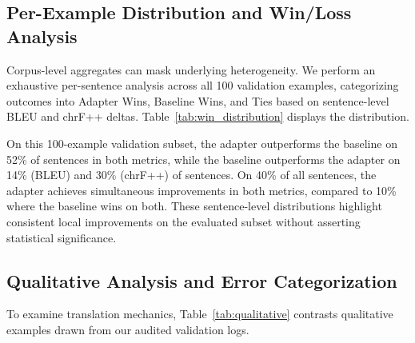 \documentclass[conference]{IEEEtran}
\begin{document}
\subsection{Per-Example Distribution and Win/Loss Analysis}
Corpus-level aggregates can mask underlying heterogeneity. We perform an exhaustive per-sentence analysis across all 100 validation examples, categorizing outcomes into Adapter Wins, Baseline Wins, and Ties based on sentence-level BLEU and chrF++ deltas. Table~\ref{tab:win_distribution} displays the distribution.

\begin{table}[ht]
\caption{Per-Example Win, Loss, and Tie Breakdown (100 Examples)}
\label{tab:win_distribution}
\centering
{}
\end{table}

On this 100-example validation subset, the adapter outperforms the baseline on 52\% of sentences in both metrics, while the baseline outperforms the adapter on 14\% (BLEU) and 30\% (chrF++) of sentences. On 40\% of all sentences, the adapter achieves simultaneous improvements in both metrics, compared to 10\% where the baseline wins on both. These sentence-level distributions highlight consistent local improvements on the evaluated subset without asserting statistical significance.

\subsection{Qualitative Analysis and Error Categorization}
To examine translation mechanics, Table~\ref{tab:qualitative} contrasts qualitative examples drawn from our audited validation logs.
\end{document}
